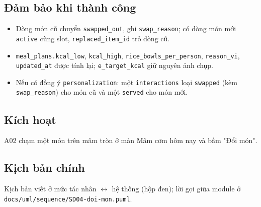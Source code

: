\subsection{Đảm bảo khi thành công}
\begin{itemize}
\item Dòng món cũ chuyển {\small\texttt{swapped\_\allowbreak{}\allowbreak{}out}}, ghi {\small\texttt{swap\_\allowbreak{}\allowbreak{}reason}}; có dòng món mới {\small\texttt{active}} cùng slot, {\small\texttt{replaced\_\allowbreak{}\allowbreak{}item\_\allowbreak{}\allowbreak{}id}} trỏ dòng cũ.
\item {\small\texttt{meal\_\allowbreak{}\allowbreak{}plans.\allowbreak{}kcal\_\allowbreak{}\allowbreak{}low}}, {\small\texttt{kcal\_\allowbreak{}\allowbreak{}high}}, {\small\texttt{rice\_\allowbreak{}\allowbreak{}bowls\_\allowbreak{}\allowbreak{}per\_\allowbreak{}\allowbreak{}person}}, {\small\texttt{reason\_\allowbreak{}\allowbreak{}vi}}, {\small\texttt{updated\_\allowbreak{}\allowbreak{}at}} được tính lại; {\small\texttt{e\_\allowbreak{}\allowbreak{}target\_\allowbreak{}\allowbreak{}kcal}} giữ nguyên ảnh chụp.
\item Nếu có đồng ý {\small\texttt{personalization}}: một {\small\texttt{interactions}} loại {\small\texttt{swapped}} (kèm {\small\texttt{swap\_\allowbreak{}\allowbreak{}reason}}) cho món cũ và một {\small\texttt{served}} cho món mới.
\end{itemize}
\subsection{Kích hoạt}
A02 chạm một món trên mâm tròn ở màn Mâm cơm hôm nay và bấm "Đổi món".

\subsection{Kịch bản chính}
Kịch bản viết ở mức tác nhân \ensuremath{\leftrightarrow} hệ thống (hộp đen); lời gọi giữa module ở {\small\texttt{docs/\allowbreak{}\allowbreak{}uml/\allowbreak{}\allowbreak{}sequence/\allowbreak{}\allowbreak{}SD04-\allowbreak{}doi-\allowbreak{}mon.\allowbreak{}puml}}.

